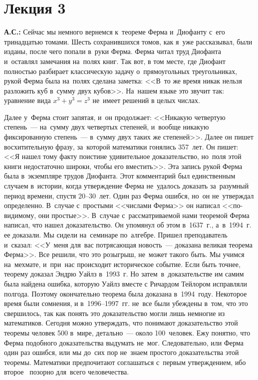 \section{Лекция 3}
\label{2.3}

\textbf{А.С.:} Сейчас мы немного вернемся к~теореме Ферма и~Диофанту с~его тринадцатью томами. Шесть сохранившихся
томов, как я~уже рассказывал, были изданы, после чего попали в~руки Ферма. Ферма читал труд
Диофанта и~оставлял замечания на~полях книг. Так вот, в том месте, где Диофант полностью разбирает
классическую задачу о~прямоугольных треугольниках, рукой Ферма была на~полях сделана заметка:
<<В~то же время никак нельзя разложить куб в~сумму двух кубов>>. На~нашем языке это звучит так:
уравнение вида $x^{3}+y^{3}=z^{3}$ не~имеет решений в целых числах.


Далее у~Ферма стоит запятая, и~он продолжает: <<Никакую четвертую степень~--- на~сумму двух четвертых степеней, и~вообще никакую
фиксированную степень~--- в~сумму двух таких же степеней>>. Далее он пишет восхитительную
фразу, за~которой математики гонялись 357~лет. Он пишет: <<Я нашел тому факту поистине удивительное
доказательство, но~поля этой книги недостаточно широки, чтобы его вместить>>.
 Эта
запись рукой Ферма была в~экземпляре трудов Диофанта. Этот комментарий был единственным случаем
в~истории, когда утверждение Ферма не~удалось доказать за~разумный период времени, спустя 20--30~лет.
Один раз Ферма ошибся, но~он не~утверждал определенно. В~случае с~простыми <<числами Ферма>> он
написал <<по-видимому, они простые>>. В~случае с~рассматриваемой нами теоремой Ферма написал, что
нашел доказательство. Он упомянул об этом в~1637~г., а~в~1994~г. ее доказали. Мы сидели на~семинаре
по~алгебре. Пришел преподаватель и~сказал: <<У~меня для~вас потрясающая новость~--- доказана великая теорема
Ферма>>.
 Все решили, что это розыгрыш, не~может такого быть. Мы учимся на~мехмате, и~при~нас
происходит историческое событие. Если быть точнее, теорему доказал Эндрю Уайлз в~1993~г. Но затем~в~доказательстве им самим
была найдена ошибка, которую Уайлз вместе с Ричардом Тейлором исправляли полгода. Поэтому окончательно теорема была доказана в~1994~году.
Некоторое время были сомнения, и в~1996--1997~гг.  не~все были убеждены в~том, что это свершилось,
так как понять это доказательство могли лишь немногие из математиков.
 Сегодня можно утверждать, что
понимают доказательство этой теоремы человек 500 в~мире, детально~--- около 100~человек. Ежу
понятно, что Ферма подобного доказательства выдумать не~мог. Следовательно, или Ферма один раз
ошибся, или мы до~сих пор не~знаем простого доказательства этой теоремы. Математики предпочитают
соглашаться с~первым утверждением, ибо второе~ позорно для~всего человечества.


